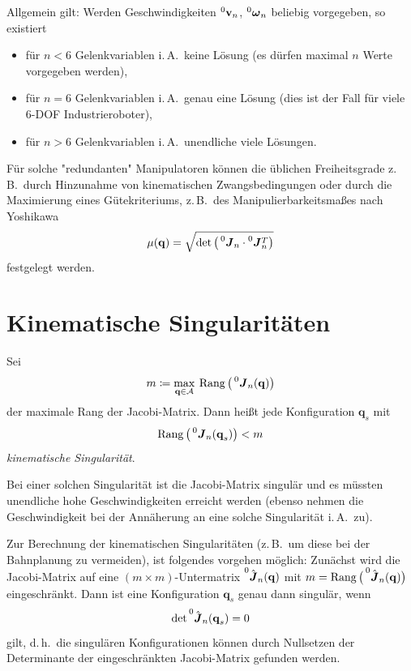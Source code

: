 \documentclass[a4paper, 11pt, accentcolor = tud3b]{tudreport}
\DeclareMathOperator{\Rang}{Rang}
\newcommand{\inreferenceto}[2]{\prescript{#1}{}{#2}}
\newcommand{\mat}[1]{\boldsymbol{#1}}
\renewcommand{\vec}[1]{\boldsymbol{\mathbf{#1}}}
\renewcommand{\dh}{d.\,h.~}
\newcommand{\zB}{z.\,B.~}
\newcommand{\iA}{i.\,A.~}
\begin{document}
			Allgemein gilt: Werden Geschwindigkeiten \( \inreferenceto{0}{\vec{v}}_n \), \( \inreferenceto{0}{\vec{\omega}}_n \) beliebig vorgegeben, so existiert
			\begin{itemize}
				\item für \( n < 6 \) Gelenkvariablen \iA keine Lösung (es dürfen maximal \(n\) Werte vorgegeben werden),
				\item für \( n = 6 \) Gelenkvariablen \iA genau eine Lösung (dies ist der Fall für viele \num{6}-DOF Industrieroboter),
				\item für \( n > 6 \) Gelenkvariablen \iA unendliche viele Lösungen.
			\end{itemize}
			Für solche "redundanten" Manipulatoren können die üblichen Freiheitsgrade \zB durch Hinzunahme von kinematischen Zwangsbedingungen oder durch die Maximierung eines Gütekriteriums, \zB des Manipulierbarkeitsmaßes nach Yoshikawa
			\begin{equation*}
				\mu(\vec{q}) = \sqrt{\det \big( \inreferenceto{0}{\mat{J}}_n \cdot \inreferenceto{0}{\mat{J}}_n^T \big)}
			\end{equation*}
			festgelegt werden.

		\section{Kinematische Singularitäten}
			Sei
			\begin{equation*}
				m \coloneqq \max_{\vec{q} \in \mathcal{A}} \> \Rang\big(\inreferenceto{0}{\mat{J}}_n(\vec{q})\big)
			\end{equation*}
			der maximale Rang der Jacobi-Matrix. Dann heißt jede Konfiguration \(\vec{q}_s\) mit
			\begin{equation*}
				\Rang\big(\inreferenceto{0}{\mat{J}}_n(\vec{q}_s)\big) < m
			\end{equation*}
			\emph{kinematische Singularität}.
			
			Bei einer solchen Singularität ist die Jacobi-Matrix singulär und es müssten unendliche hohe Geschwindigkeiten erreicht werden (ebenso nehmen die Geschwindigkeit bei der Annäherung an eine solche Singularität \iA zu).
			
			Zur Berechnung der kinematischen Singularitäten (\zB um diese bei der Bahnplanung zu vermeiden), ist folgendes vorgehen möglich: Zunächst wird die Jacobi-Matrix auf eine \( (m \times m) \)-Untermatrix \( \inreferenceto{0}{\hat{\mat{J}}}_n(\vec{q}) \) mit \( m = \Rang\big(\inreferenceto{0}{\hat{\mat{J}}}_n(\vec{q})\big) \) eingeschränkt. Dann ist eine Konfiguration \(\vec{q}_s\) genau dann singulär, wenn
			\begin{equation*}
				\det \inreferenceto{0}{\hat{\mat{J}}}_n(\vec{q}_s) = 0
			\end{equation*}
			gilt, \dh die singulären Konfigurationen können durch Nullsetzen der Determinante der eingeschränkten Jacobi-Matrix gefunden werden.
\end{document}
